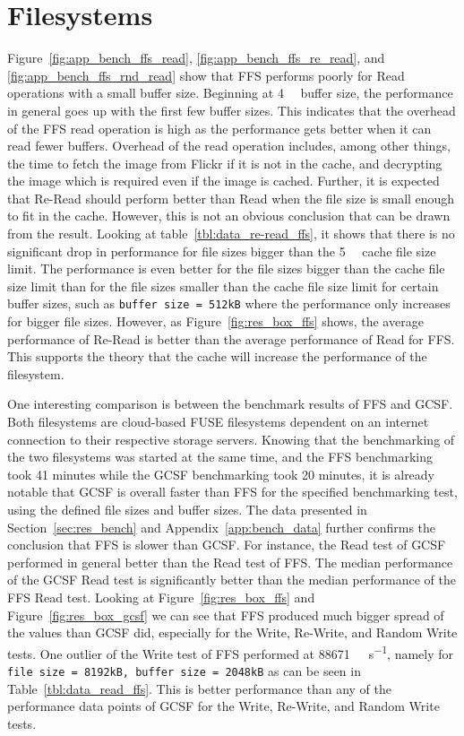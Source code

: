 \section{Filesystems}
Figure~\ref{fig:app_bench_ffs_read}, \ref{fig:app_bench_ffs_re_read}, and \ref{fig:app_bench_ffs_rnd_read} show that \gls{FFS} performs poorly for Read operations with a small buffer size. Beginning at \SI{4}{\kilo\byte} buffer size, the performance in general goes up with the first few buffer sizes. This indicates that the overhead of the \gls{FFS} read operation is high as the performance gets better when it can read fewer buffers. Overhead of the read operation includes, among other things, the time to fetch the image from Flickr if it is not in the cache, and decrypting the image which is required even if the image is cached. Further, it is expected that Re-Read should perform better than Read when the file size is small enough to fit in the cache. However, this is not an obvious conclusion that can be drawn from the result. Looking at table~\ref{tbl:data_re-read_ffs}, it shows that there is no significant drop in performance for file sizes bigger than the \SI{5}{\mega\byte} cache file size limit. The performance is even better for the file sizes bigger than the cache file size limit than for the file sizes smaller than the cache file size limit for certain buffer sizes, such as \texttt{buffer size = 512kB} where the performance only increases for bigger file sizes. However, as Figure~\ref{fig:res_box_ffs} shows, the average performance of Re-Read is better than the average performance of Read for \gls{FFS}. This supports the theory that the cache will increase the performance of the filesystem.

One interesting comparison is between the benchmark results of \gls{FFS} and \gls{GCSF}. Both filesystems are cloud-based \gls{FUSE} filesystems dependent on an internet connection to their respective storage servers. Knowing that the benchmarking of the two filesystems was started at the same time, and the \gls{FFS} benchmarking took 41 minutes while the \gls{GCSF} benchmarking took 20 minutes, it is already notable that \gls{GCSF} is overall faster than \gls{FFS} for the specified benchmarking test, using the defined file sizes and buffer sizes. The data presented in Section~\ref{sec:res_bench} and Appendix~\ref{app:bench_data} further confirms the conclusion that \gls{FFS} is slower than \gls{GCSF}. For instance, the Read test of \gls{GCSF} performed in general better than the Read test of \gls{FFS}. The median performance of the \gls{GCSF} Read test is significantly better than the median performance of the \gls{FFS} Read test. Looking at Figure~\ref{fig:res_box_ffs} and Figure~\ref{fig:res_box_gcsf} we can see that \gls{FFS} produced much bigger spread of the values than \gls{GCSF} did, especially for the Write, Re-Write, and Random Write tests. One outlier of the Write test of \gls{FFS} performed at \SI[per-mode = symbol]{88671}{\kilo\byte\per\second}, namely for \texttt{file size = 8192kB, buffer size = 2048kB} as can be seen in Table~\ref{tbl:data_read_ffs}. This is better performance than any of the performance data points of \gls{GCSF} for the Write, Re-Write, and Random Write tests.

